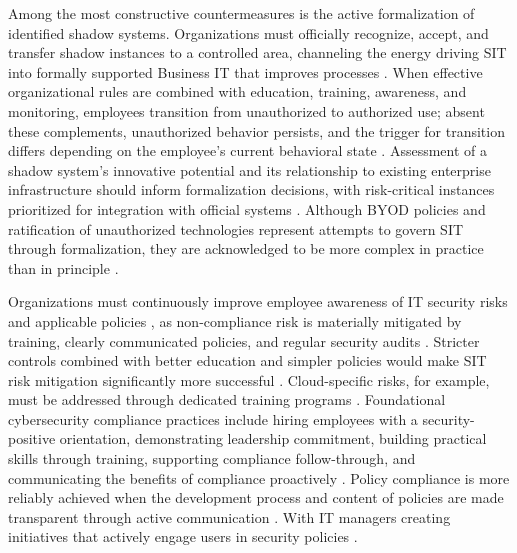\documentclass[12pt,oneside]{article}
\begin{document}
\newpage

Among the most constructive countermeasures is the active formalization of identified shadow systems. Organizations must officially recognize, accept, and transfer shadow instances to a controlled area, channeling the energy driving \ac{SIT} into formally supported Business \ac{IT} that improves processes \citep[4]{keskin2021domesticating}. When effective organizational rules are combined with education, training, awareness, and monitoring, employees transition from unauthorized to authorized use; absent these complements, unauthorized behavior persists, and the trigger for transition differs depending on the employee's current behavioral state \citep[6-7, 5]{pirani2014consumerization}. Assessment of a shadow system's innovative potential and its relationship to existing enterprise infrastructure should inform formalization decisions, with risk-critical instances prioritized for integration with official systems \citep[150, 151]{rakovic2020shadow}. Although \ac{BYOD} policies and ratification of unauthorized technologies represent attempts to govern \ac{SIT} through formalization, they are acknowledged to be more complex in practice than in principle \citep[427]{mallmann2021mediating}.

Organizations must continuously improve employee awareness of \ac{IT} security risks and applicable policies \citep[12]{silvius2012factors}, as non-compliance risk is materially mitigated by training, clearly communicated policies, and regular security audits \citep[6]{gyoery2012exploring}. Stricter controls combined with better education and simpler policies would make \ac{SIT} risk mitigation significantly more successful \citep[279]{silic2014shadow}. Cloud-specific risks, for example, must be addressed through dedicated training programs \citep[654]{walterbusch2017missing}. Foundational cybersecurity compliance practices include hiring employees with a security-positive orientation, demonstrating leadership commitment, building practical skills through training, supporting compliance follow-through, and communicating the benefits of compliance proactively \citep[195]{cram2020maximizing}. Policy compliance is more reliably achieved when the development process and content of policies are made transparent through active communication \citep[3]{lueker2016consumerization}. With \ac{IT} managers creating initiatives that actively engage users in security policies \citep[26]{mallmann2018influence}.
\end{document}
